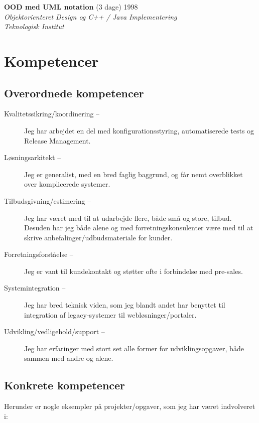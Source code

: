 \documentclass[a4paper,11pt]{article}
\begin{document}
\textbf{OOD med UML notation} \hfill (3 dage) 1998 \\
\textsl{Objektorienteret Design og C++ / Java Implementering\\Teknologisk Institut}


\section*{Kompetencer}

\subsection*{Overordnede kompetencer}

\begin{description}

  \item[Kvalitetssikring/koordinering --] Jeg har arbejdet en del
    med konfigurationsstyring, automatiserede tests og Release
    Management.

  \item[Løsningsarkitekt --] Jeg er generalist, med en bred faglig
    baggrund, og får nemt overblikket over komplicerede systemer.

  \item[Tilbudsgivning/estimering --] Jeg har været med til at
    udarbejde flere, både små og store, tilbud. Desuden har jeg både
    alene og med forretningskonsulenter være med til at skrive
    anbefalinger/udbudsmateriale for kunder.

  \item[Forretningsforståelse --] Jeg er vant til kundekontakt og
    støtter ofte i forbindelse med pre-sales.

  \item[Systemintegration --] Jeg har bred teknisk viden, som jeg
    blandt andet har benyttet til integration af legacy-systemer til
    webløsninger/portaler.

  \item[Udvikling/vedligehold/support --] Jeg har erfaringer med
    stort set alle former for udviklingsopgaver, både sammen med
    andre og alene.

\end{description}

\subsection*{Konkrete kompetencer}

Herunder er nogle eksempler på projekter/opgaver, som jeg har været
indvolveret i:
\end{document}

